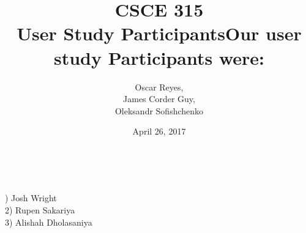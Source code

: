 \documentclass[12pt]{report}
\title{CSCE 315 \\ User Study Participants}
\author{Oscar Reyes,\\
	James Corder Guy,\\
	Oleksandr Sofishchenko}
\date{April 26, 2017}
\begin{document}
	
	\maketitle
	
	\newpage
	
	\begin{center}
		\title{\textbf{Our user study Participants were:}} \\
		
	\end{center}


		) Josh Wright\\
		2) Rupen Sakariya\\
		3) Alishah Dholasaniya\\
		
	
	
	
\end{document}
